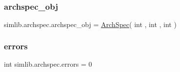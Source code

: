 \subsubsection{\texorpdfstring{archspec\+\_\+obj}{archspec\_obj}}
{\footnotesize\ttfamily simlib.\+archspec.\+archspec\+\_\+obj = \mbox{\hyperlink{classsimlib_1_1archspec_1_1_arch_spec}{Arch\+Spec}}( int , int , int )}

\mbox{\label{namespacesimlib_1_1archspec_a417dd2991c99643d042aec6e1c95039d}} 
\subsubsection{\texorpdfstring{errors}{errors}}
{\footnotesize\ttfamily int simlib.\+archspec.\+errors = 0}

